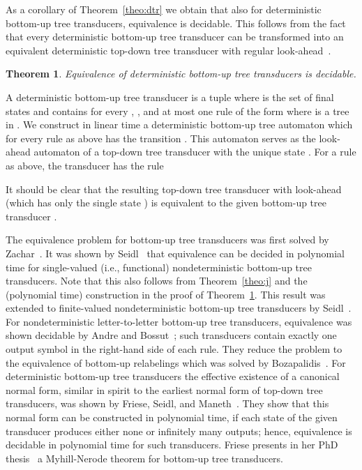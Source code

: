 \documentclass[copyright,creativecommons]{eptcs}
\newtheorem{theorem}{Theorem}
\newcommand{\eop}{\hspace*{\fill}}
\newenvironment{proof}{{\it Proof.}\quad}{\eop\vspace*{4mm}}
\begin{document}
As a corollary of Theorem~\ref{theo:dtr} we obtain that
also for deterministic bottom-up tree transducers,
equivalence is decidable.
This follows from the fact that every deterministic bottom-up tree transducer
can be transformed into an equivalent deterministic top-down tree transducer
with regular look-ahead~\cite{DBLP:journals/mst/Engelfriet77}.

\begin{theorem}\rm\label{theo:bu}
Equivalence of deterministic bottom-up tree transducers is decidable.
\end{theorem}
\begin{proof}
A deterministic bottom-up tree transducer is a 
tuple 
where  is the set of final states and  contains
for every , , and 
at most one rule of the form 
 where
 is a tree in .
We construct in linear time a deterministic bottom-up 
tree automaton which for every rule
as above has the transition .
This automaton serves as the look-ahead automaton of a top-down
tree transducer with the unique state .
For a rule as above, the transducer has the rule

It should be clear that the resulting top-down tree transducer 
with look-ahead  (which has only the single state )
is equivalent to the given bottom-up tree transducer .
\end{proof}

The equivalence problem for bottom-up tree transducers was first solved
by Zachar~\cite{DBLP:journals/actaC/Zachar80}.
It was shown by Seidl~\cite{DBLP:journals/tcs/Seidl92} 
that equivalence can be decided in polynomial time for
single-valued (i.e., functional) nondeterministic bottom-up tree transducers. 
Note that this also follows from Theorem~\ref{theo:j} and the (polynomial time)
construction in the proof of Theorem~\ref{theo:bu}.
This result was extended to finite-valued nondeterministic bottom-up
tree transducers by Seidl~\cite{DBLP:journals/mst/Seidl94}.
For nondeterministic letter-to-letter bottom-up tree transducers, equivalence
was shown decidable by Andre and Bossut~\cite{DBLP:conf/tapsoft/AndreB95};
such transducers contain exactly one output symbol in the right-hand side
of each rule.
They reduce the problem to the equivalence of bottom-up relabelings which
was solved by Bozapalidis~\cite{DBLP:journals/tcs/Bozapalidis92}.
For deterministic bottom-up tree transducers the effective existence of a
canonical normal form, similar in spirit to the earliest normal
form of top-down tree transducers, was shown by Friese, Seidl, 
and Maneth~\cite{DBLP:journals/ijfcs/FrieseSM11}. They show that this normal
form can be constructed in polynomial time, if each state of the given
transducer produces either none or infinitely many outputs; hence, 
equivalence is decidable in polynomial time for such transducers.
Friese presents in her PhD thesis~\cite{Friese10Thesis} a Myhill-Nerode theorem
for bottom-up tree transducers.
\end{document}
